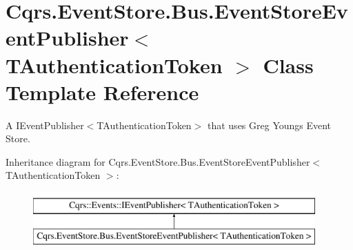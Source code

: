 \hypertarget{classCqrs_1_1EventStore_1_1Bus_1_1EventStoreEventPublisher}{}\section{Cqrs.\+Event\+Store.\+Bus.\+Event\+Store\+Event\+Publisher$<$ T\+Authentication\+Token $>$ Class Template Reference}
\label{classCqrs_1_1EventStore_1_1Bus_1_1EventStoreEventPublisher}


A I\+Event\+Publisher$<$\+T\+Authentication\+Token$>$ that uses Greg Young\textquotesingle{}s Event Store.  


Inheritance diagram for Cqrs.\+Event\+Store.\+Bus.\+Event\+Store\+Event\+Publisher$<$ T\+Authentication\+Token $>$\+:\begin{figure}[H]
\begin{center}
\leavevmode
\includegraphics[height=2.000000cm]{classCqrs_1_1EventStore_1_1Bus_1_1EventStoreEventPublisher}
\end{center}
\end{figure}
